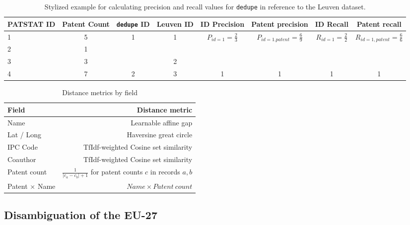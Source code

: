 \documentclass[11pt]{article}
\begin{document}
\begin{landscape}
  \begin{table}[t]
    \footnotesize
    \centering
    \begin{tabular}{l|c|c|c||c|c|c|c}
      PATSTAT ID & Patent Count & \texttt{dedupe} ID & Leuven ID & ID Precision &
      Patent precision & ID Recall & Patent recall\\
      \hline
      1 & 5 & \multirow{3}{*}{1} & \multirow{2}{*}{1} &
      \multirow{3}{*}{$P_{id=1} = \frac{2}{3}$} &
      \multirow{3}{*}{$P_{id=1. patent} = \frac{6}{9}$} &     
      \multirow{3}{*}{$R_{id=1} = \frac{2}{2}$} & 
      \multirow{3}{*}{$R_{id=1, patent} = \frac{6}{6}$}\\
      2 & 1 & & & & & &\\
      3 & 3 & & 2 & & & &\\
      \hline
      4 & 7 & 2 & 3 & 1 & 1 &1 & 1 \\
    \end{tabular}
    \caption{Stylized example for calculating precision and recall values for \texttt{dedupe} in
      reference to the Leuven dataset.}
    \label{tab:precision-calc}
  \end{table}

\begin{table}[t]
  \centering
{\footnotesize
  \begin{tabular}{lr}
    Field & Distance metric \\
    \hline
    Name  & Learnable affine gap \\
    Lat / Long & Haversine great circle \\
    IPC Code & TfIdf-weighted Cosine set similarity \\
    Coauthor & TfIdf-weighted Cosine set similarity \\
    Patent count & $\frac{1}{\left|c_a -
      c_b\right| + 1}$ for patent counts $c$ in
    records $a, b$\\
    Patent $\times$ Name & $Name \times Patent~count$ \\
    \hline
  \end{tabular}
}
  \caption{Distance metrics by field}
  \label{tab:dist-metrics}
\end{table}

\end{landscape}


\subsection{Disambiguation of the EU-27}
\label{sec:core-countries}
\end{document}
